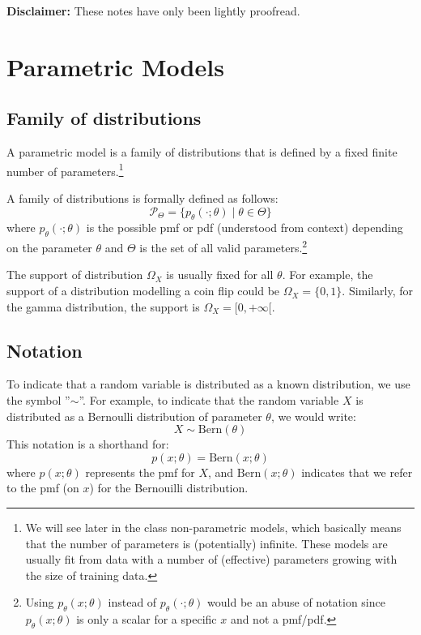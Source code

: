 \documentclass[12pt]{report}
\newcommand{\defobj}[1]{\color{red}#1\color{black}{}}
\newcommand{\defmean}[1]{\color{green!70!black}#1\color{black}{}}
\renewcommand{\emph}[1]{\color{violet}#1\color{black}{}}
\newcommand{\Bern}{\text{Bern}}
\begin{document}
 
 

\maketitle

\textbf{Disclaimer:} These notes have only been lightly proofread.

\section{Parametric Models}

\subsection{Family of distributions}
A \emph{parametric model} is a family of distributions that is defined by a fixed finite number of parameters.\footnote{We will see later in the class \emph{non-parametric models}, which basically means that the number of parameters is (potentially) infinite. These models are usually fit from data with a number of (effective) parameters growing with the size of training data.}

A \defobj{family of distributions} is formally defined as follows:
\defmean{$$ \mathcal{P}_\Theta = \{ p_\theta (\cdot ; \theta) \mid \theta \in \Theta \} $$}
where $  p_\theta (\cdot ; \theta) $ is the possible pmf or pdf (understood from context) depending on the parameter $ \theta $ and $ \Theta $ is the set of all valid parameters.\footnote{Using $ p_\theta (x ; \theta) $ instead of $ p_\theta (\cdot ; \theta) $ would be an abuse of notation since $ p_\theta (x ; \theta) $ is only a scalar for a specific $ x $ and not a pmf/pdf.}

The support of distribution $ \Omega_{X} $ is usually fixed for all $ \theta $. For example, the support of a distribution modelling a coin flip could be $ \Omega_{X} = \{ 0,1 \}$. Similarly, for the gamma distribution, the support is $ \Omega_{X} = \lbrack 0, + \infty \lbrack$.

\subsection{Notation}
To indicate that a random variable is distributed as a known distribution, we use the symbol ''$ \sim $''. For example, to indicate that the random variable $ X $ is distributed as a Bernoulli distribution of parameter $ \theta $, we would write:
$$ X \sim \Bern (\theta) $$
This notation is a shorthand for:
$$ p(x ; \theta) = \Bern (x ; \theta) $$
where $p(x ; \theta)$ represents the pmf for $X$, and $\Bern (x ; \theta)$ indicates that we refer to the pmf (on $x$) for the Bernouilli distribution.
\end{document}
